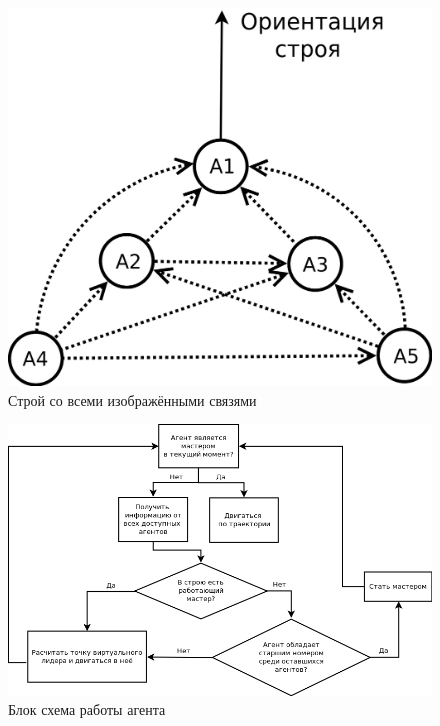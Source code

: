 \documentclass[10pt]{beamer}
\begin{document}
\begin{frame}[noframenumbering]
	
	\begin{figure}
		\centering
		\includegraphics[width=0.7\linewidth]{platoon/wedge-platoon-full}
		\caption{Строй со всеми изображёнными связями}
		\label{fig:wedge-platoon-full}
	\end{figure}
\end{frame}
\begin{frame}[noframenumbering]
\begin{figure}
	\centering
	\includegraphics[width=1\linewidth]{others/algo-dia}
	\caption{Блок схема работы агента}
	\label{fig:algo-dia}
\end{figure}

\end{frame}
\end{document}
